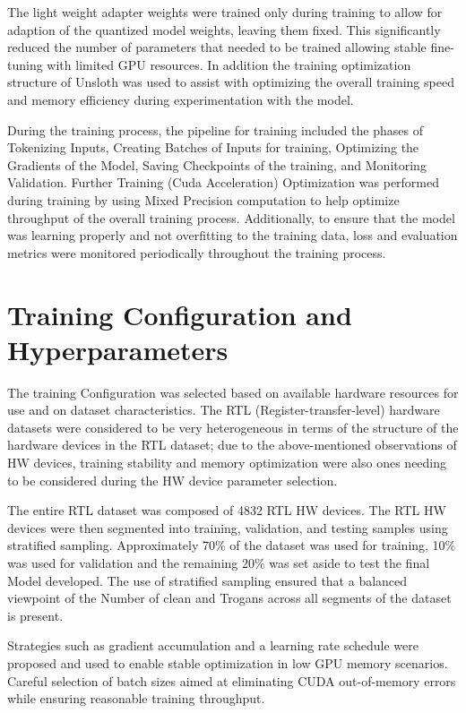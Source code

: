 \documentclass[12pt,a4paper]{report}
\begin{document}
The light weight adapter weights were trained only during training to allow for adaption of the quantized model weights, leaving them fixed. This significantly reduced the number of parameters that needed to be trained allowing stable fine-tuning with limited GPU resources. In addition the training optimization structure of Unsloth was used to assist with optimizing the overall training speed and memory efficiency during experimentation with the model. 

During the training process, the pipeline for training included the phases of Tokenizing Inputs, Creating Batches of Inputs for training, Optimizing the Gradients of the Model, Saving Checkpoints of the training, and Monitoring Validation. Further Training (Cuda Acceleration) Optimization was performed during training by using Mixed Precision computation to help optimize throughput of the overall training process. Additionally, to ensure that the model was learning properly and not overfitting to the training data, loss and evaluation metrics were monitored periodically throughout the training process.


\section{Training Configuration and Hyperparameters}

The training Configuration was selected based on available hardware resources for use and on dataset characteristics. The RTL (Register-transfer-level) hardware datasets were considered to be very heterogeneous in terms of the structure of the hardware devices in the RTL dataset; due to the above-mentioned observations of HW devices, training stability and memory optimization were also ones needing to be considered during the HW device parameter selection. 

The entire RTL dataset was composed of 4832 RTL HW devices. The RTL HW devices were then segmented into training, validation, and testing samples using stratified sampling. Approximately 70\% of the dataset was used for training, 10\% was used for validation and the remaining 20\% was set aside to test the final Model developed. The use of stratified sampling ensured that a balanced viewpoint of the Number of clean and Trogans across all segments of the dataset is present.

Strategies such as gradient accumulation and a learning rate schedule were proposed and used to enable stable optimization in low GPU memory scenarios. Careful selection of batch sizes aimed at eliminating CUDA out-of-memory errors while ensuring reasonable training throughput.
\end{document}
